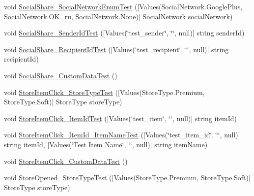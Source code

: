 \begin{DoxyCompactItemize}
\item 
void \mbox{\hyperlink{class_unity_engine_1_1_analytics_1_1_tests_1_1_analytics_event_tests_a8b8542f1440a97754c58cffcbbb50e94}{Social\+Share\+\_\+\+Social\+Network\+Enum\+Test}} (\mbox{[}Values(Social\+Network.\+Google\+Plus, Social\+Network.\+O\+K\+\_\+ru, Social\+Network.\+None)\mbox{]} Social\+Network social\+Network)
\item 
void \mbox{\hyperlink{class_unity_engine_1_1_analytics_1_1_tests_1_1_analytics_event_tests_aa3e5a5ded3430c425a90cc1710ca62bb}{Social\+Share\+\_\+\+Sender\+Id\+Test}} (\mbox{[}Values(\char`\"{}test\+\_\+sender\char`\"{}, \char`\"{}\char`\"{}, null)\mbox{]} string sender\+Id)
\item 
void \mbox{\hyperlink{class_unity_engine_1_1_analytics_1_1_tests_1_1_analytics_event_tests_a9db0ada7d56bcebc51996d890faa2dbf}{Social\+Share\+\_\+\+Recipient\+Id\+Test}} (\mbox{[}Values(\char`\"{}test\+\_\+recipient\char`\"{}, \char`\"{}\char`\"{}, null)\mbox{]} string recipient\+Id)
\item 
void \mbox{\hyperlink{class_unity_engine_1_1_analytics_1_1_tests_1_1_analytics_event_tests_a394cbfd31924b7f9d44353615cdaec87}{Social\+Share\+\_\+\+Custom\+Data\+Test}} ()
\item 
void \mbox{\hyperlink{class_unity_engine_1_1_analytics_1_1_tests_1_1_analytics_event_tests_ac3e710a862ec62e1a2a4760eef4b6483}{Store\+Item\+Click\+\_\+\+Store\+Type\+Test}} (\mbox{[}Values(Store\+Type.\+Premium, Store\+Type.\+Soft)\mbox{]} Store\+Type store\+Type)
\item 
void \mbox{\hyperlink{class_unity_engine_1_1_analytics_1_1_tests_1_1_analytics_event_tests_a96cd3363401266c7f364590a712d7146}{Store\+Item\+Click\+\_\+\+Item\+Id\+Test}} (\mbox{[}Values(\char`\"{}test\+\_\+item\char`\"{}, \char`\"{}\char`\"{}, null)\mbox{]} string item\+Id)
\item 
void \mbox{\hyperlink{class_unity_engine_1_1_analytics_1_1_tests_1_1_analytics_event_tests_ad3c295de3153f529adb558010cb20185}{Store\+Item\+Click\+\_\+\+Item\+Id\+\_\+\+Item\+Name\+Test}} (\mbox{[}Values(\char`\"{}test\+\_\+item\+\_\+id\char`\"{}, \char`\"{}\char`\"{}, null)\mbox{]} string item\+Id, \mbox{[}Values(\char`\"{}Test Item Name\char`\"{}, \char`\"{}\char`\"{}, null)\mbox{]} string item\+Name)
\item 
void \mbox{\hyperlink{class_unity_engine_1_1_analytics_1_1_tests_1_1_analytics_event_tests_ab94d3d4c86864f903d989de1e5b3dab8}{Store\+Item\+Click\+\_\+\+Custom\+Data\+Test}} ()
\item 
void \mbox{\hyperlink{class_unity_engine_1_1_analytics_1_1_tests_1_1_analytics_event_tests_a4a800c6bec6c7fc5b3197d702123e20c}{Store\+Opened\+\_\+\+Store\+Type\+Test}} (\mbox{[}Values(Store\+Type.\+Premium, Store\+Type.\+Soft)\mbox{]} Store\+Type store\+Type)

\end{DoxyCompactItemize}
